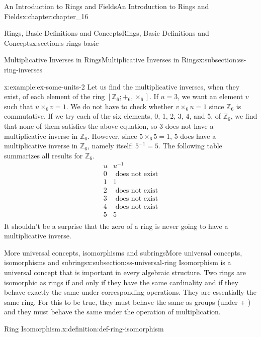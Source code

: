 \documentclass[twoside,10pt,]{book}
\numberwithin{equation}{section}
\begin{document}
\begin{chapterptx}{An Introduction to Rings and Fields}{}{An Introduction to Rings and Fields}{}{}{x:chapter:chapter_16}
\begin{sectionptx}{Rings, Basic Definitions and Concepts}{}{Rings, Basic Definitions and Concepts}{}{}{x:section:s-rings-basic}
\begin{subsectionptx}{Multiplicative Inverses in Rings}{}{Multiplicative Inverses in Rings}{}{}{x:subsection:ss-ring-inverses}
\begin{example}{}{x:example:ex-some-units-2}%
Let us find the multiplicative inverses, when they exist, of each element of the ring \([\mathbb{Z}_6; +_6, \times_6]\). If \(u = 3\), we want an element \(v\) such that \(u\times_6v=1\). We do not have to check whether \(v\times_6u=1\) since \(\mathbb{Z}_6\) is commutative. If we try each of the six elements, 0, 1, 2, 3, 4, and 5, of \(\mathbb{Z}_6\), we find that none of them satisfies the above equation, so 3 does not have a multiplicative inverse in \(\mathbb{Z}_6\). However, since \(5\times_6 5=1\), 5 does have a multiplicative inverse in \(\mathbb{Z}_6\), namely itself:  \(5^{-1}=5\). The following table summarizes all results for \(\mathbb{Z}_6\).%
\begin{equation*}
\begin{array}{cc}
u & u^{-1} \\
0 & \textrm{ does} \textrm{ not} \textrm{ exist} \\
1 & 1 \\
2 & \textrm{ does} \textrm{ not} \textrm{ exist} \\
3 & \textrm{ does} \textrm{ not} \textrm{ exist} \\
4 & \textrm{ does} \textrm{ not} \textrm{ exist} \\
5 & 5 \\
\end{array}
\end{equation*}
It shouldn't be a surprise that the zero of a ring is never going to have a multiplicative inverse.%
\end{example}
\end{subsectionptx}
%
%
\typeout{************************************************}
\typeout{************************************************}
%
\begin{subsectionptx}{More universal concepts, isomorphisms and subrings}{}{More universal concepts, isomorphisms and subrings}{}{}{x:subsection:ss-universal-ring}
Isomorphism is a universal concept that is important in every algebraic structure. Two rings are isomorphic as rings if and only if they have the same cardinality and if they behave exactly the same under corresponding operations. They are essentially the same ring. For this to be true, they must behave the same as groups (under + ) and they must behave the same under the operation of multiplication.%
\begin{definition}{Ring Isomorphism.}{x:definition:def-ring-isomorphism}%

\end{definition}
\end{subsectionptx}
\end{sectionptx}
\end{chapterptx}
\end{document}
